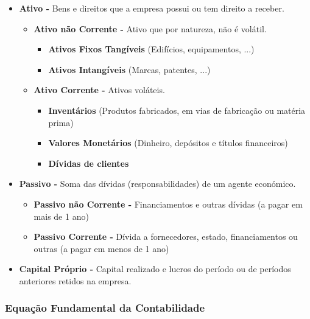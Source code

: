 \documentclass[11pt]{article}
\begin{document}
\begin{itemize}[topsep=0pt]
    \item \textbf{Ativo -} Bens e direitos que a empresa possui ou tem direito a receber.
          \begin{itemize}[topsep=0pt]
              \item \textbf{Ativo não Corrente -} Ativo que por natureza, não é volátil.
                    \begin{itemize}
                        \item \textbf{Ativos Fixos Tangíveis} (Edifícios, equipamentos, ...)
                        \item \textbf{Ativos Intangíveis} (Marcas, patentes, ...)
                    \end{itemize}
              \item \textbf{Ativo Corrente -} Ativos voláteis.
                    \begin{itemize}
                        \item \textbf{Inventários} (Produtos fabricados, em vias de fabricação ou matéria prima)
                        \item \textbf{Valores Monetários} (Dinheiro, depósitos e títulos financeiros)
                        \item \textbf{Dívidas de clientes}
                    \end{itemize}
          \end{itemize}
    \item \textbf{Passivo -} Soma das dívidas (responsabilidades) de um agente económico.
          \begin{itemize}[topsep=0pt]
              \item \textbf{Passivo não Corrente -} Financiamentos e outras dívidas (a pagar em mais de 1 ano)
              \item \textbf{Passivo Corrente -} Dívida a fornecedores, estado, financiamentos ou outras (a pagar em menos de 1 ano)
          \end{itemize}
    \item \textbf{Capital Próprio -} Capital realizado e lucros do período ou de períodos anteriores retidos na empresa.
\end{itemize}

\newpage

\subsubsection*{Equação Fundamental da Contabilidade}
\end{document}
